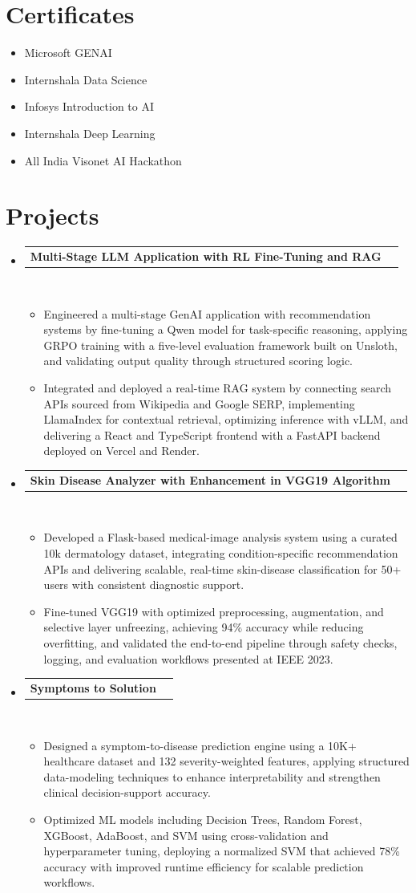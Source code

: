 \documentclass[letterpaper,11pt]{article}
\newcommand{\resumeItem}[1]{\item\small{{#1 \vspace{-3pt}}}}
\newcommand{\resumeProjectHeading}[2]{
    \vspace{-3pt}\item
    \begin{tabularx}{0.995\textwidth}[t]{Xr}
      \small\textbf{#1} & #2 \\
    \end{tabularx}\\[-3pt]
    \vspace{3pt}
}
\newcommand{\resumeItemListStart}{\begin{itemize}}
\newcommand{\resumeItemListEnd}{\end{itemize}\vspace{-4pt}}
\newcommand{\resumeSubHeadingListStart}{
  \begin{itemize}[leftmargin=0.12in, label={}]
  \setlength{\itemsep}{0pt}
  \setlength{\parsep}{0pt}
  \setlength{\parskip}{0pt}
}
\newcommand{\resumeSubHeadingListEnd}{\end{itemize}}
\begin{document}
\section{Certificates}
\vspace{-4pt}
\resumeItemListStart
\resumeItem{Microsoft GENAI}
\resumeItem{Internshala Data Science}
\resumeItem{Infosys Introduction to AI}
\resumeItem{Internshala Deep Learning}
\resumeItem{All India Visonet AI Hackathon}
\resumeItemListEnd

\section{Projects}
\vspace{-4pt}
\resumeSubHeadingListStart

\resumeProjectHeading
{Multi-Stage LLM Application with RL Fine-Tuning and RAG}{}
\resumeItemListStart
\resumeItem{Engineered a multi-stage GenAI application with recommendation systems by fine-tuning a Qwen model for task-specific reasoning, applying GRPO training with a five-level evaluation framework built on Unsloth, and validating output quality through structured scoring logic.}
\resumeItem{Integrated and deployed a real-time RAG system by connecting search APIs sourced from Wikipedia and Google SERP, implementing LlamaIndex for contextual retrieval, optimizing inference with vLLM, and delivering a React and TypeScript frontend with a FastAPI backend deployed on Vercel and Render.}
\resumeItemListEnd

\resumeProjectHeading
{Skin Disease Analyzer with Enhancement in VGG19 Algorithm}{}
\resumeItemListStart
\resumeItem{Developed a Flask-based medical-image analysis system using a curated 10k dermatology dataset, integrating condition-specific recommendation APIs and delivering scalable, real-time skin-disease classification for 50+ users with consistent diagnostic support.}
\resumeItem{Fine-tuned VGG19 with optimized preprocessing, augmentation, and selective layer unfreezing, achieving 94\% accuracy while reducing overfitting, and validated the end-to-end pipeline through safety checks, logging, and evaluation workflows presented at IEEE 2023.}
\resumeItemListEnd

\resumeProjectHeading
{Symptoms to Solution}{}
\resumeItemListStart
\resumeItem{Designed a symptom-to-disease prediction engine using a 10K+ healthcare dataset and 132 severity-weighted features, applying structured data-modeling techniques to enhance interpretability and strengthen clinical decision-support accuracy.}
\resumeItem{Optimized ML models including Decision Trees, Random Forest, XGBoost, AdaBoost, and SVM using cross-validation and hyperparameter tuning, deploying a normalized SVM that achieved 78\% accuracy with improved runtime efficiency for scalable prediction workflows.}
\resumeItemListEnd

\resumeSubHeadingListEnd
\end{document}
